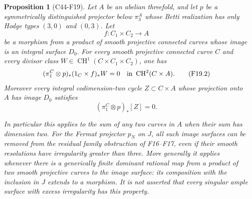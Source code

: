 \documentclass[11pt]{article}
\newtheorem{proposition}[theorem]{Proposition}
\theoremstyle{remark}\newtheorem{remark}[theorem]{Remark}
\begin{document}
\begin{proposition}[C44-F19]\label{C44-F19}
Let $A$ be an abelian threefold, and let $p$ be a symmetrically
distinguished projector below $\pi_3^A$ whose Betti realization
has only Hodge types $(3,0)$ and $(0,3)$.  Let
\[
                 f:C_1\times C_2\longrightarrow A
 \tag{F19.1}
\]
be a morphism from a product of smooth projective connected
curves whose image is an integral surface $D_0$.
For every smooth projective connected curve $C$ and every
divisor class $W\in\operatorname{CH}^1(C\times C_1\times C_2)$,
one has
\[
 (\pi_1^C\otimes p)_*(1_C\times f)_*W=0
                    \quad\hbox{in }\operatorname{CH}^2(C\times A).
 \tag{F19.2}
\]
Moreover every integral codimension-two cycle
$Z\subset C\times A$ whose projection onto $A$ has image
$D_0$ satisfies
\[
                         (\pi_1^C\otimes p)_*[Z]=0.
 \tag{F19.3}
\]

In particular this applies to the sum of any two curves in
$A$ when their sum has dimension two.  For the Fermat
projector $p_N$ on $J$, all such image surfaces can be
removed from the residual family obstruction of F16--F17,
even if their smooth resolutions have irregularity greater
than three.  More generally it applies whenever there is a
generically finite dominant rational map from a product of
two smooth projective curves to the image surface: its
composition with the inclusion in $J$ extends to a morphism.
It is not asserted that every
singular ample surface with excess irregularity has this
property.
\end{proposition}
\end{document}

